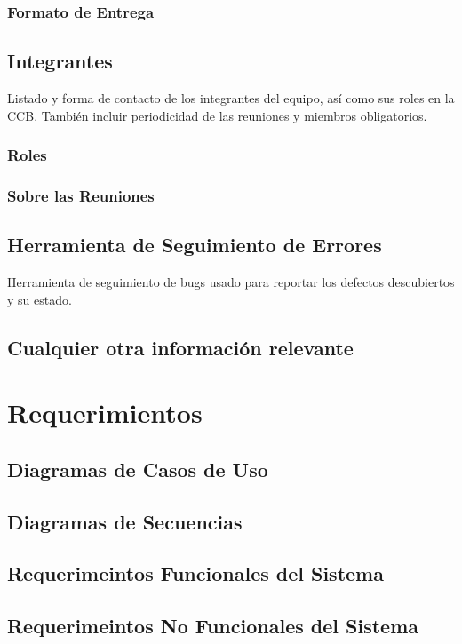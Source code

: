 \documentclass[10pt]{article} %
\begin{document}
\subsubsection{Formato de Entrega}

\subsection{Integrantes}
Listado y forma de contacto de los integrantes del equipo, así como sus roles en la CCB. También incluir periodicidad de las reuniones y miembros obligatorios.
\subsubsection{Roles}
\subsubsection{Sobre las Reuniones}

\subsection{Herramienta de Seguimiento de Errores}
Herramienta de seguimiento de bugs usado para reportar los defectos descubiertos y su estado.

\subsection{Cualquier otra información relevante}


\section{Requerimientos}

\subsection{Diagramas de Casos de Uso}

\subsection{Diagramas de Secuencias}

\subsection{Requerimeintos Funcionales del Sistema}

\subsection{Requerimeintos No Funcionales del Sistema}
\end{document}
